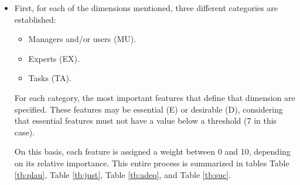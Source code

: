 \begin{itemize}
\item First, for each of the dimensions mentioned, three different categories are established:

	\begin{itemize}
	\item Managers and/or users (MU).
	\item Experts (EX).
	\item Tasks (TA).
	\end{itemize}

	\vspace{2mm}

	For each category, the most important features that define that dimension are specified. These features may be essential (E) or desirable (D), considering that essential features must not have a value below a threshold (7 in this case).

	\vspace{2mm}

	On this basis, each feature is assigned a weight between 0 and 10, depending on its relative importance. This entire process is summarized in tables Table \ref{tb:plau}, Table \ref{tb:just}, Table \ref{tb:adeq}, and Table \ref{tb:suc}.\newline


\end{itemize}
